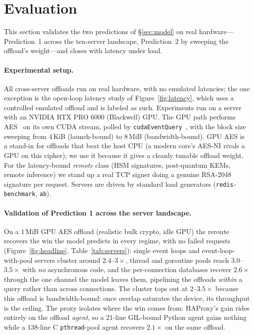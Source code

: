 \section{Evaluation}
\label{sec:eval}

This section validates the two predictions of \S\ref{sec:model} on real hardware---Prediction~1
across the ten-server landscape, Prediction~2 by sweeping the offload's weight---and closes with
latency under load.

\paragraph{Experimental setup.}
All cross-server offloads run on real hardware, with no emulated latencies; the one
exception is the open-loop latency study of Figure~\ref{fig:latency}, which uses a controlled
emulated offload and is labeled as such. Experiments run on a server with an NVIDIA RTX PRO 6000
(Blackwell) GPU. The GPU path performs AES~\citep{openssl} on its own CUDA stream, polled by
\texttt{cudaEventQuery}~\citep{cudastreams}, with the block size sweeping from $4$\,KiB
(launch-bound) to $8$\,MiB (bandwidth-bound). GPU AES is a stand-in for offloads that beat the
host CPU (a modern core's AES-NI rivals a GPU on this cipher); we use it because it gives a
cleanly tunable offload weight. For the latency-bound \emph{remote} class (HSM
signatures, post-quantum KEMs, remote inference) we stand up a real TCP signer doing a genuine
RSA-2048 signature per request. Servers are driven by standard load generators
(\texttt{redis-benchmark}, \texttt{ab}).

\paragraph{Validation of Prediction 1 across the server landscape.}
On a $1$\,MiB GPU AES offload (realistic bulk crypto, idle GPU) the reroute recovers the win the
model predicts in every regime, with no failed requests (Figure~\ref{fig:headline},
Table~\ref{tab:servers}): single event loops and event-loop-with-pool servers cluster around
$2.4$--$3\times$, thread and goroutine pools reach $3.0$--$3.5\times$ with \emph{no} asynchronous
code, and the per-connection databases recover $2.6\times$ through the one channel the model
leaves them, pipelining the offloads \emph{within} a query rather than across connections.
The cluster tops out at $2$--$3.5\times$ because this offload is bandwidth-bound: once
overlap saturates the device, its throughput is the ceiling. The proxy isolates where the win comes from:
HAProxy's gain rides entirely on the offload \emph{agent}, so a 21-line GIL-bound Python agent
gains nothing while a 138-line C \texttt{pthread}-pool agent recovers $2.1\times$ on the same
offload.

